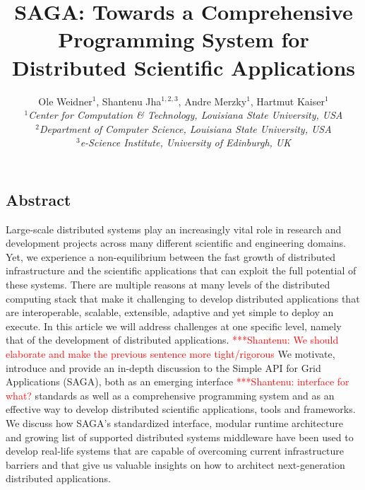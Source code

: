 \documentclass[a4paper,10pt]{article}
\newcommand{\jhanote}[1]{  {\textcolor{red}     { ***Shantenu: #1 }}}
\newcommand{\jhanote}[1]{}
\begin{document}
 \title{ \large \vspace{-3.5em} SAGA: Towards a Comprehensive Programming System for Distributed Scientific Applications }
 
 \author{\normalsize Ole Weidner$^{1}$, Shantenu Jha$^{1,2,3}$, Andre Merzky$^{1}$, Hartmut Kaiser$^{1}$ \\
   \small{\emph{$^{1}$Center for Computation \& Technology, Louisiana State University, USA}}\\
   \small{\emph{$^{2}$Department of Computer Science, Louisiana State University, USA}}\\
   \small{\emph{$^{3}$e-Science Institute, University of Edinburgh, UK}}
 }
 \date{}
 \maketitle
 




\subsection*{Abstract}

Large-scale distributed systems play an increasingly vital role in
research and development projects across many different scientific and
engineering domains. Yet, we experience a non-equilibrium between the
fast growth of distributed infrastructure and the scientific
applications that can exploit the full potential of these
systems. There are multiple reasons at many levels of the distributed
computing stack that make it challenging to develop distributed
applications that are interoperable, scalable, extensible, adaptive
and yet simple to deploy an execute.  In this article we will address
challenges at one specific level, namely that of the development of
distributed applications. \jhanote{We should elaborate and make the
  previous sentence more tight/rigorous} We motivate, introduce and
provide an in-depth discussion to the Simple API for Grid Applications
(SAGA), both as an emerging interface \jhanote{interface for what?}
standards as well as a comprehensive programming system and as an
effective way to develop distributed scientific applications, tools
and frameworks.  We discuss how SAGA's standardized interface, modular
runtime architecture and growing list of supported distributed systems
middleware have been used to develop real-life systems that are
capable of overcoming current infrastructure barriers and that give us
valuable insights on how to architect next-generation distributed
applications.
\end{document}
